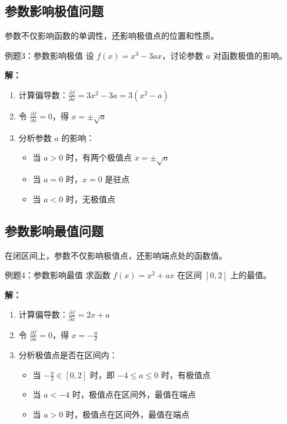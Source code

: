 \documentclass[a4paper,11pt]{ctexart}
\newcommand{\partialder}[2]{\frac{\partial #1}{\partial #2}}
\theoremstyle{definition}
\theoremstyle{remark}
\begin{document}
\subsection{参数影响极值问题}

参数不仅影响函数的单调性，还影响极值点的位置和性质。

\begin{examplebox}{例题3：参数影响极值}
设 $f(x) = x^3 - 3ax$，讨论参数 $a$ 对函数极值的影响。

\textbf{解：}
\begin{enumerate}
    \item 计算偏导数：$\partialder{f}{x} = 3x^2 - 3a = 3(x^2 - a)$
    \item 令 $\partialder{f}{x} = 0$，得 $x = \pm\sqrt{a}$
    \item 分析参数 $a$ 的影响：
    \begin{itemize}
        \item 当 $a > 0$ 时，有两个极值点 $x = \pm\sqrt{a}$
        \item 当 $a = 0$ 时，$x = 0$ 是驻点
        \item 当 $a < 0$ 时，无极值点
    \end{itemize}
\end{enumerate}
\end{examplebox}

\subsection{参数影响最值问题}

在闭区间上，参数不仅影响极值点，还影响端点处的函数值。

\begin{examplebox}{例题4：参数影响最值}
求函数 $f(x) = x^2 + ax$ 在区间 $[0,2]$ 上的最值。

\textbf{解：}
\begin{enumerate}
    \item 计算偏导数：$\partialder{f}{x} = 2x + a$
    \item 令 $\partialder{f}{x} = 0$，得 $x = -\frac{a}{2}$
    \item 分析极值点是否在区间内：
    \begin{itemize}
        \item 当 $-\frac{a}{2} \in [0,2]$ 时，即 $-4 \leq a \leq 0$ 时，有极值点
        \item 当 $a < -4$ 时，极值点在区间外，最值在端点
        \item 当 $a > 0$ 时，极值点在区间外，最值在端点
    \end{itemize}
\end{enumerate}
\end{examplebox}
\end{document}
